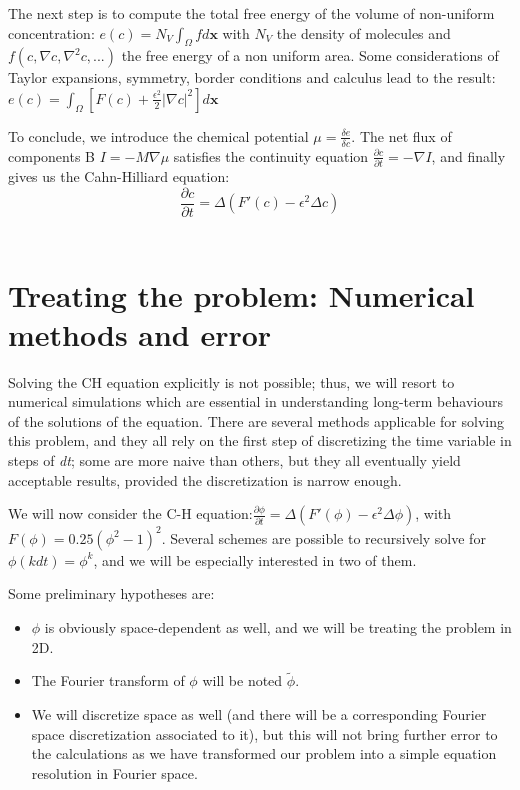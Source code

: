 \documentclass[11pt,a4paper]{report}
\begin{document}
The next step is to compute the total free energy of the volume of non-uniform concentration: $e(c)=N_V\int_{\Omega}f d\mathbf{x}$ with $N_V$ the density of molecules and $f(c,\nabla c, \nabla^2 c,...)$ the free energy of a non uniform area. Some considerations of Taylor expansions, symmetry, border conditions and calculus lead to the result: $e(c)=\int_{\Omega}[F(c)+\frac{\epsilon^2}{2}|\nabla c|^2]d\mathbf{x}$

To conclude, we introduce the chemical potential $\mu=\frac{\delta e}{\delta c}$. The net flux of components B $I=-M\nabla \mu$ satisfies the continuity equation $\frac{\partial c}{\partial t}=-\nabla I$, and finally gives us the Cahn-Hilliard equation: $$\frac{\partial c}{\partial t}=\Delta(F'(c)-\epsilon^2\Delta c)$$\\


\section{Treating the problem: Numerical methods and error}

Solving the CH equation explicitly is not possible; thus, we will resort to numerical simulations which are essential in understanding long-term behaviours of the solutions of the equation. There are several methods applicable for solving this problem, and they all rely on the first step of discretizing the time variable in steps of \textit{dt}; some are more naive than others, but they all eventually yield acceptable results, provided the discretization is narrow enough.

We will now consider the C-H equation:$\frac{\partial \phi}{\partial t}=\Delta(F'(\phi)-\epsilon^2\Delta \phi)$, with $F(\phi)=0.25(\phi^2-1)^2$. Several schemes are possible to recursively solve for $\phi(kdt)=\phi^k$, and we will be especially interested in two of them.

Some preliminary hypotheses are:
\begin{itemize}
    \item $\phi$ is obviously space-dependent as well, and we will be treating the problem in 2D.
    \item The Fourier transform of $\phi$ will be noted $\tilde{\phi}$.
    \item We will discretize space as well (and there will be a corresponding Fourier space discretization associated to it), but this will not bring further error to the calculations as we have transformed our problem into a simple equation resolution in Fourier space.
\end{itemize}
\end{document}
